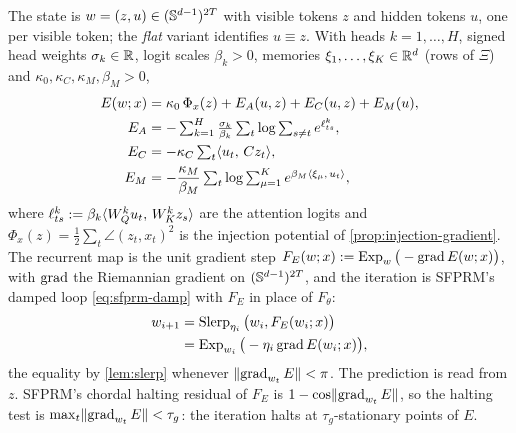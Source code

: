 \begin{definition}
\label{def:esfprm}
The state is $w=(z,u)\in(\mathbb{S}^{d-1})^{2T}$ with visible tokens $z$ and hidden tokens $u$, one per
visible token; the \emph{flat} variant identifies $u\equiv z$. With heads $k=1,\dots,H$, signed head
weights $\sigma_k\in\mathbb{R}$, logit scales $\beta_k>0$, memories $\xi_1,\dots,\xi_K\in\mathbb{R}^d$ (rows of
$\Xi$) and $\kappa_0,\kappa_C,\kappa_M,\beta_M>0$,
\begin{equation}
\begin{aligned}
  E(w;x) &= \kappa_0\,\Phi_x(z) + E_A(u,z) + E_C(u,z) + E_M(u),\\
  E_A &= -\textstyle\sum_{k=1}^H\frac{\sigma_k}{\beta_k}\sum_{t}\log\sum_{s\neq t}e^{\ell^k_{ts}},\\
  E_C &= -\kappa_C\textstyle\sum_t\langle u_t,\, Cz_t\rangle,\\
  E_M &= -\frac{\kappa_M}{\beta_M}\textstyle\sum_t\log\sum_{\mu=1}^Ke^{\beta_M\langle \xi_\mu,\, u_t\rangle},
\end{aligned}
\label{eq:energy}
\end{equation}
where $\ell^k_{ts}:=\beta_k\langle W_Q^ku_t,\, W_K^kz_s\rangle$ are the attention logits and
$\Phi_x(z)=\tfrac12\sum_t\angle(z_t,x_t)^2$ is the injection potential of
\cref{prop:injection-gradient}. The recurrent map is the unit gradient step
$F_E(w;x):=\operatorname{Exp}_w\big(-\operatorname{grad} E(w;x)\big)$, with $\operatorname{grad}$ the Riemannian gradient on
$(\mathbb{S}^{d-1})^{2T}$, and the iteration is SFPRM's damped loop \eqref{eq:sfprm-damp} with $F_E$ in
place of $F_\theta$:
\begin{equation}
\begin{aligned}
  w_{i+1}&=\operatorname{Slerp}_{\eta_i}\big(w_i,F_E(w_i;x)\big)\\&=\operatorname{Exp}_{w_i}\big(-\eta_i\operatorname{grad} E(w_i;x)\big),
\end{aligned}
  \label{eq:esfprm-step}
\end{equation}
the equality by \cref{lem:slerp} whenever $\lVert \operatorname{grad}_{w_t}E\rVert<\pi$. The prediction is read from
$z$. SFPRM's chordal halting residual of $F_E$ is $1-\cos\lVert \operatorname{grad}_{w_t}E\rVert$, so the halting test
is $\max_t\lVert \operatorname{grad}_{w_t}E\rVert<\tau_g$: the iteration halts at $\tau_g$-stationary points of $E$.
\end{definition}

